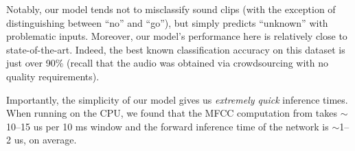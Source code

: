 \documentclass[12pt]{article}
\begin{document}
\begin{table}[h]
	\centering
	\caption{Column-normalized confusion matrix of our performance on the test set (i.e. each column represents the per-class classification percentages of our model). Percentages that round to zero are omitted.}
	\label{fig:results_table}
\end{table}

Notably, our model tends not to misclassify sound clips (with the exception of distinguishing between ``no'' and ``go''), but simply predicts ``unknown'' with problematic inputs. Moreover, our model's performance here is relatively close to state-of-the-art. Indeed, the best known classification accuracy on this dataset is just over 90\% \cite{kaggle.com_tensorflow_nodate} (recall that the audio was obtained via crowdsourcing with no quality requirements).

Importantly, the simplicity of our model gives us \emph{extremely quick} inference times. When running on the CPU, we found that the MFCC computation from \cite{james_lyons_python_speech_features:_nodate} takes ${\sim}$10--15 us per 10 ms window and the forward inference time of the network is ${\sim}$1--2 us, on average.
\end{document}
